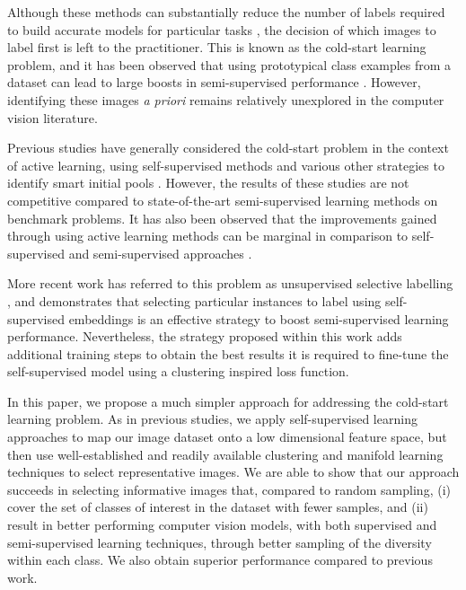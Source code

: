 \documentclass{article}
\begin{document}
Although these methods can substantially reduce the number of labels required to build accurate models for particular tasks \citep{sajun2022investigating, taleb2022self}, the decision of which images to label first is left to the practitioner. This is known as the cold-start learning problem, and it has been observed that using prototypical class examples from a dataset can lead to large boosts in semi-supervised performance \citep{wang2022freematch}. However, identifying these images \textit{a priori} remains relatively unexplored in the computer vision literature.

Previous studies have generally considered the cold-start problem in the context of active learning, using self-supervised methods and various other strategies to identify smart initial pools \citep{jin2022cold, yi2022using, ju2022extending, chandra2021initial}. However, the results of these studies are not competitive compared to state-of-the-art semi-supervised learning methods on benchmark problems. It has also been observed that the improvements gained through using active learning methods can be marginal in comparison to self-supervised and semi-supervised approaches \citep{boushehri2020annotation, chan2021marginal}. 

More recent work has referred to this problem as unsupervised selective labelling \citep{wang2022unsupervised}, and demonstrates that selecting particular instances to label using self-supervised embeddings is an effective strategy to boost semi-supervised learning performance. Nevertheless, the strategy proposed within this work adds additional training steps \textemdash{} to obtain the best results it is required to fine-tune the self-supervised model using a clustering inspired loss function.

In this paper, we propose a much simpler approach for addressing the cold-start learning problem. As in previous studies, we apply self-supervised learning approaches to map our image dataset onto a low dimensional feature space, but then use well-established and readily available clustering and manifold learning techniques to select representative images. We are able to show that our approach succeeds in selecting informative images that, compared to random sampling, (i) cover the set of classes of interest in the dataset with fewer samples, and (ii) result in better performing computer vision models, with both supervised and semi-supervised learning techniques, through better sampling of the diversity within each class. We also obtain superior performance compared to previous work.
\end{document}
